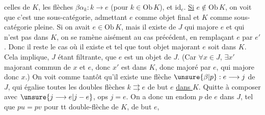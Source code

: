 celles de $K$, les flèches $\beta\alpha_k:k\longrightarrow e$ (pour $k\in\mathrm{Ob}\,K$), et $\mathrm{id}_e$. \uline{Si} $e\notin\mathrm{Ob}\,K$, on voit que c'est  une sous-catégorie, admettant $e$ comme objet final et $K$ comme sous-catégorie pleine. Si on avait $e\in\mathrm{Ob}\,K$, mais il existe   de $J$ qui majore $e$ et qui n'est pas dans $K$,  on se ramène aisément au cas précédent, en remplaçant $e$ par $e'$ .
\unsure{$[\![$|$[$} Donc il reste le cas où il existe    et  tel que tout objet majorant $e$ soit dans $K$.  Cela implique, $J$ étant filtrante, que $e$ est un  objet  de $J$. (Car $\forall x\in J$, $\exists x'$ majorant commun de $x$ et $e$, donc $x'$ est dans $K$, donc majoré par $e$, qui majore donc $x$.) \unsure{=} On voit comme tantôt qu'il existe une flèche $\unsure{\beta|p}:e\longrightarrow j$ de $J$, qui égalise toutes les doubles flèches $k\rightrightarrows e$ de but $e$ \uline{dans $K$}. Quitte à composer avec $\unsure{j\longrightarrow e|j-e}$, ops $j=e$. On a donc un endom $p$ de $e$ dans $J$, tel que $pu=pv$ pour tt double-flèche   de $K$, de but $e$,
